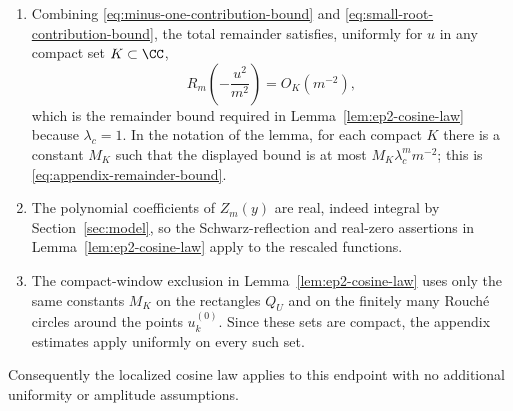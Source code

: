\begin{proposition}
\begin{enumerate}
\[=O_K(m^{-2}),
\]
which are exactly \eqref{eq:y-bound}.  The logarithmic estimate \eqref{eq:log-lambda-minus-one} then gives the contribution bound \eqref{eq:minus-one-contribution-bound}, and the small-root estimate gives \eqref{eq:small-root-contribution-bound}.
\item Combining \eqref{eq:minus-one-contribution-bound} and \eqref{eq:small-root-contribution-bound}, the total remainder satisfies, uniformly for \(u\) in any compact set \(K\subset\CC\),
\[
R_m\!\left(-\frac{u^2}{m^2}\right)=O_K(m^{-2}),
\]
which is the remainder bound required in Lemma~\ref{lem:ep2-cosine-law} because \(\lambda_c=1\).  In the notation of the lemma, for each compact \(K\) there is a constant \(M_K\) such that the displayed bound is at most \(M_K\lambda_c^m m^{-2}\); this is \eqref{eq:appendix-remainder-bound}.
\item The polynomial coefficients of \(Z_m(y)\) are real, indeed integral by Section~\ref{sec:model}, so the Schwarz-reflection and real-zero assertions in Lemma~\ref{lem:ep2-cosine-law} apply to the rescaled functions.
\item The compact-window exclusion in Lemma~\ref{lem:ep2-cosine-law} uses only the same constants \(M_K\) on the rectangles \(Q_U\) and on the finitely many Rouch\'e circles around the points \(u_k^{(0)}\).  Since these sets are compact, the appendix estimates apply uniformly on every such set.
\end{enumerate}
Consequently the localized cosine law applies to this endpoint with no additional uniformity or amplitude assumptions.
\end{proposition}

